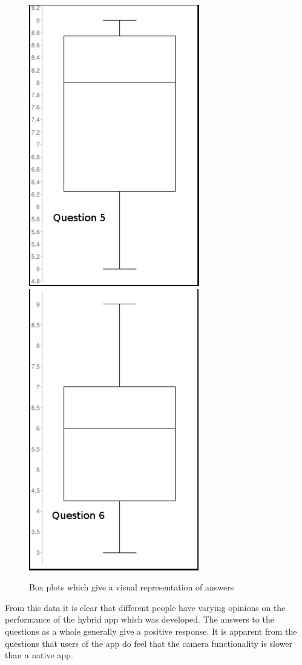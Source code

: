 \begin{center}
\begin{figure}[H]
\includegraphics[scale=0.45]{images/q5}
\includegraphics[scale=0.45]{images/q6}
\caption{Box plots which give a visual representation of answers}
\end{figure}
\end{center}
From this data it is clear that different people have varying opinions on the performance of the hybrid app which was developed. The answers to the questions as a whole generally give a positive response. It is apparent from the questions that users of the app do feel that the camera functionality is slower than a native app.


